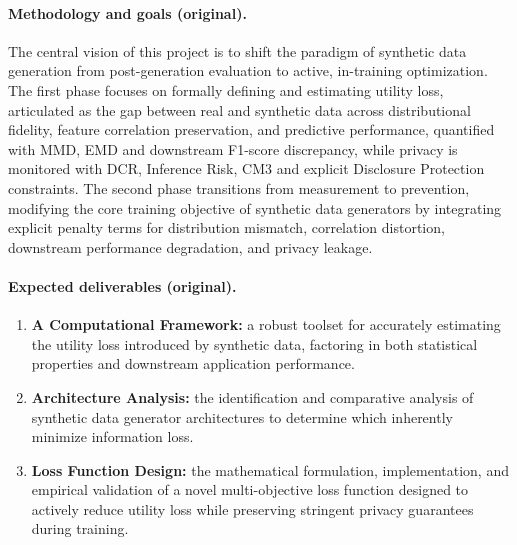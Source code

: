 \documentclass[11pt,a4paper]{article}
\begin{document}
\paragraph{Methodology and goals (original).}
The central vision of this project is to shift the paradigm of synthetic data
generation from post-generation evaluation to active, in-training
optimization. The first phase focuses on formally defining and estimating
utility loss, articulated as the gap between real and synthetic data across
distributional fidelity, feature correlation preservation, and predictive
performance, quantified with MMD, EMD and downstream F1-score discrepancy,
while privacy is monitored with DCR, Inference Risk, CM3 and explicit
Disclosure Protection constraints. The second phase transitions from
measurement to prevention, modifying the core training objective of synthetic
data generators by integrating explicit penalty terms for distribution
mismatch, correlation distortion, downstream performance degradation, and
privacy leakage.

\paragraph{Expected deliverables (original).}
\begin{enumerate}[nosep]
  \item \textbf{A Computational Framework:} a robust toolset for accurately
        estimating the utility loss introduced by synthetic data, factoring in
        both statistical properties and downstream application performance.
  \item \textbf{Architecture Analysis:} the identification and comparative
        analysis of synthetic data generator architectures to determine which
        inherently minimize information loss.
  \item \textbf{Loss Function Design:} the mathematical formulation,
        implementation, and empirical validation of a novel multi-objective
        loss function designed to actively reduce utility loss while preserving
        stringent privacy guarantees during training.
\end{enumerate}
\end{document}
